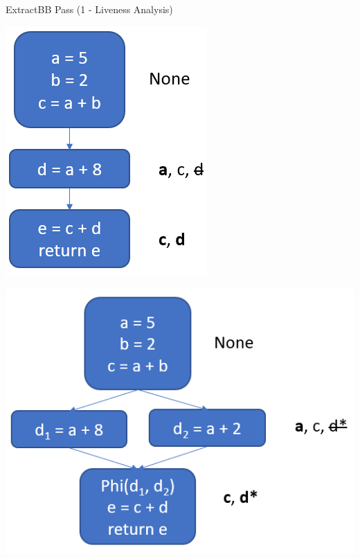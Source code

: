 \documentclass{beamer}
\begin{document}
\begin{frame}{ExtractBB Pass (1 - Liveness Analysis)}
    \begin{overprint}
        \centering
        \includegraphics[height=0.8\textheight]{images/liveness1.png}

        \centering
        \includegraphics[height=0.8\textheight]{images/liveness2.png}


\end{overprint}
\end{frame}
\end{document}
